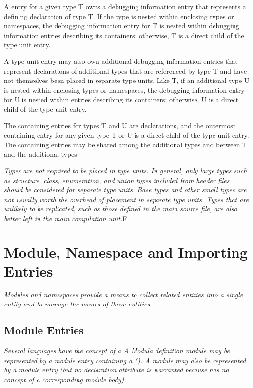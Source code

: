 A  entry for a given type T owns a debugging
information entry that represents a defining declaration
of type T. If the type is nested within enclosing types or
namespaces, the debugging information entry for T is nested
within debugging information entries describing its containers;
otherwise, T is a direct child of the type unit entry.

A type unit entry may also own additional debugging information
entries that represent declarations of additional types that
are referenced by type T and have not themselves been placed in
separate type units. Like T, if an additional type U is nested
within enclosing types or namespaces, the debugging information
entry for U is nested within entries describing its containers;
otherwise, U is a direct child of the type unit entry.

The containing entries for types T and U are declarations,
and the outermost containing entry for any given type T or
U is a direct child of the type unit entry. The containing
entries may be shared among the additional types and between
T and the additional types.

\textit{Types are not required to be placed in type units. In general,
only large types such as structure, class, enumeration, and
union types included from header files should be considered
for separate type units. Base types and other small types
are not usually worth the overhead of placement in separate
type units. Types that are unlikely to be replicated, such
as those defined in the main source file, are also better
left in the main compilation unit.}F

\section{Module, Namespace and Importing Entries}
\textit{Modules and namespaces provide a means to collect related
entities into a single entity and to manage the names of
those entities.}

\subsection{Module Entries}
\label{chap:moduleentries}
\textit{Several languages have the concept of a 
A Modula definition module 
may be represented by a module
entry containing a 
(\DWATdeclaration). A
 module 
may also be represented by a module entry
(but no declaration attribute is warranted because 
has no concept of a corresponding module body).}

